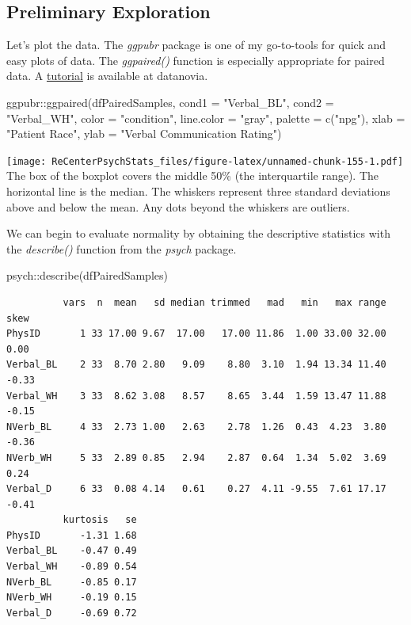\documentclass[
  11pt,
]{book}
\newenvironment{Shaded}{\begin{snugshade}}{\end{snugshade}}
\newcommand{\AttributeTok}[1]{\textcolor[rgb]{0.77,0.63,0.00}{#1}}
\newcommand{\FunctionTok}[1]{\textcolor[rgb]{0.00,0.00,0.00}{#1}}
\newcommand{\NormalTok}[1]{#1}
\newcommand{\SpecialCharTok}[1]{\textcolor[rgb]{0.00,0.00,0.00}{#1}}
\newcommand{\StringTok}[1]{\textcolor[rgb]{0.31,0.60,0.02}{#1}}
\begin{document}
\hypertarget{preliminary-exploration-2}{%
\subsection{Preliminary Exploration}\label{preliminary-exploration-2}}

Let's plot the data. The \emph{ggpubr} package is one of my go-to-tools for quick and easy plots of data. The \emph{ggpaired()} function is especially appropriate for paired data. A \href{https://rpkgs.datanovia.com/ggpubr/reference/ggpaired.html}{tutorial} is available at datanovia.

\begin{Shaded}
\begin{Highlighting}[]
\NormalTok{ggpubr}\SpecialCharTok{::}\FunctionTok{ggpaired}\NormalTok{(dfPairedSamples, }\AttributeTok{cond1 =} \StringTok{"Verbal\_BL"}\NormalTok{, }\AttributeTok{cond2 =} \StringTok{"Verbal\_WH"}\NormalTok{,}
    \AttributeTok{color =} \StringTok{"condition"}\NormalTok{, }\AttributeTok{line.color =} \StringTok{"gray"}\NormalTok{, }\AttributeTok{palette =} \FunctionTok{c}\NormalTok{(}\StringTok{"npg"}\NormalTok{), }\AttributeTok{xlab =} \StringTok{"Patient Race"}\NormalTok{,}
    \AttributeTok{ylab =} \StringTok{"Verbal Communication Rating"}\NormalTok{)}
\end{Highlighting}
\end{Shaded}

\texttt{[image: ReCenterPsychStats\_files/figure-latex/unnamed-chunk-155-1.pdf]}
The box of the boxplot covers the middle 50\% (the interquartile range). The horizontal line is the median. The whiskers represent three standard deviations above and below the mean. Any dots beyond the whiskers are outliers.

We can begin to evaluate normality by obtaining the descriptive statistics with the \emph{describe()} function from the \emph{psych} package.

\begin{Shaded}
\begin{Highlighting}[]
\NormalTok{psych}\SpecialCharTok{::}\FunctionTok{describe}\NormalTok{(dfPairedSamples)}
\end{Highlighting}
\end{Shaded}

\begin{verbatim}
          vars  n  mean   sd median trimmed   mad   min   max range  skew
PhysID       1 33 17.00 9.67  17.00   17.00 11.86  1.00 33.00 32.00  0.00
Verbal_BL    2 33  8.70 2.80   9.09    8.80  3.10  1.94 13.34 11.40 -0.33
Verbal_WH    3 33  8.62 3.08   8.57    8.65  3.44  1.59 13.47 11.88 -0.15
NVerb_BL     4 33  2.73 1.00   2.63    2.78  1.26  0.43  4.23  3.80 -0.36
NVerb_WH     5 33  2.89 0.85   2.94    2.87  0.64  1.34  5.02  3.69  0.24
Verbal_D     6 33  0.08 4.14   0.61    0.27  4.11 -9.55  7.61 17.17 -0.41
          kurtosis   se
PhysID       -1.31 1.68
Verbal_BL    -0.47 0.49
Verbal_WH    -0.89 0.54
NVerb_BL     -0.85 0.17
NVerb_WH     -0.19 0.15
Verbal_D     -0.69 0.72
\end{verbatim}
\end{document}
